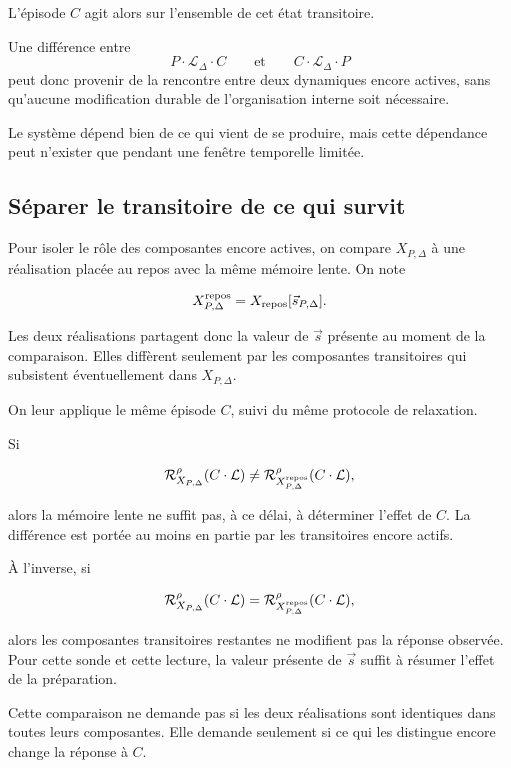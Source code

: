 L'épisode $C$ agit alors sur l'ensemble de cet état transitoire.

Une différence entre
\[
P\cdot\mathcal L_{\Delta}\cdot C
\qquad\text{et}\qquad
C\cdot\mathcal L_{\Delta}\cdot P
\]
peut donc provenir de la rencontre entre deux dynamiques encore actives, sans qu'aucune modification durable de l'organisation interne soit nécessaire.

Le système dépend bien de ce qui vient de se produire, mais cette dépendance peut n'exister que pendant une fenêtre temporelle limitée.

\subsection{Séparer le transitoire de ce qui survit}

Pour isoler le rôle des composantes encore actives, on compare
\(X_{P,\Delta}\) à une réalisation placée au repos avec la même mémoire lente.
On note

\[
X^{\rm repos}_{P,\Delta}
=
X_{\rm repos}[\vec s_{P,\Delta}].
\]

Les deux réalisations partagent donc la valeur de \(\vec s\) présente
au moment de la comparaison. Elles diffèrent seulement par les
composantes transitoires qui subsistent éventuellement dans
\(X_{P,\Delta}\).

On leur applique le même épisode \(C\), suivi du même protocole de
relaxation.

Si

\[
\mathcal R^\rho_{X_{P,\Delta}}(C\cdot\mathcal L)
\neq
\mathcal R^\rho_{X^{\rm repos}_{P,\Delta}}(C\cdot\mathcal L),
\]

alors la mémoire lente ne suffit pas, à ce délai, à déterminer l'effet
de \(C\). La différence est portée au moins en partie par les
transitoires encore actifs.

À l'inverse, si

\[
\mathcal R^\rho_{X_{P,\Delta}}(C\cdot\mathcal L)
=
\mathcal R^\rho_{X^{\rm repos}_{P,\Delta}}(C\cdot\mathcal L),
\]

alors les composantes transitoires restantes ne modifient pas la
réponse observée. Pour cette sonde et cette lecture, la valeur présente
de \(\vec s\) suffit à résumer l'effet de la préparation.

Cette comparaison ne demande pas si les deux réalisations sont identiques dans toutes leurs composantes. Elle demande seulement si ce qui les distingue encore change la réponse à $C$.

